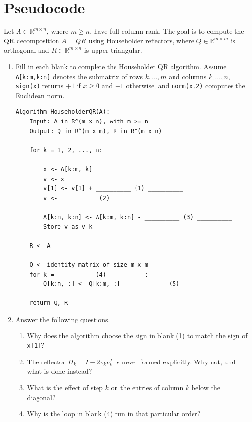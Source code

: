 \documentclass{ximera}
\begin{document}
\section{Pseudocode}

\begin{exercise}

Let $A \in \mathbb{R}^{m \times n}$, where $m \geq n$, have full column rank.
The goal is to compute the QR decomposition $A = QR$ using
Householder reflectors, where $Q \in \mathbb{R}^{m\times m}$ is orthogonal
and $R \in \mathbb{R}^{m \times n}$ is upper triangular.

\begin{enumerate}
    \item Fill in each blank to complete the Householder QR algorithm.
Assume \texttt{A[k:m,k:n]} denotes the submatrix of rows $k,\dots,m$ and
columns $k,\dots,n$, \texttt{sign(x)} returns $+1$ if $x \ge 0$ and $-1$
otherwise, and \texttt{norm(x,2)} computes the Euclidean norm.

\begin{lstlisting}
Algorithm HouseholderQR(A):
    Input: A in R^(m x n), with m >= n
    Output: Q in R^(m x m), R in R^(m x n)

    for k = 1, 2, ..., n:

        x <- A[k:m, k]
        v <- x
        v[1] <- v[1] + __________ (1) __________
        v <- __________ (2) __________
        
        A[k:m, k:n] <- A[k:m, k:n] - __________ (3) __________
        Store v as v_k

    R <- A

    Q <- identity matrix of size m x m
    for k = __________ (4) __________:
        Q[k:m, :] <- Q[k:m, :] - __________ (5) __________

    return Q, R
\end{lstlisting}

\item Answer the following questions.
\begin{enumerate}[label=\arabic*.]
    \item Why does the algorithm choose the sign in blank (1) to match
    the sign of \texttt{x[1]}?
    \item The reflector $H_k = I - 2v_kv_k^T$ is never formed explicitly.
    Why not, and what is done instead?
    \item What is the effect of step $k$ on the entries of column $k$
    below the diagonal?
    \item Why is the loop in blank (4) run in that particular order?
\end{enumerate}


\end{enumerate}
\end{exercise}
\end{document}
